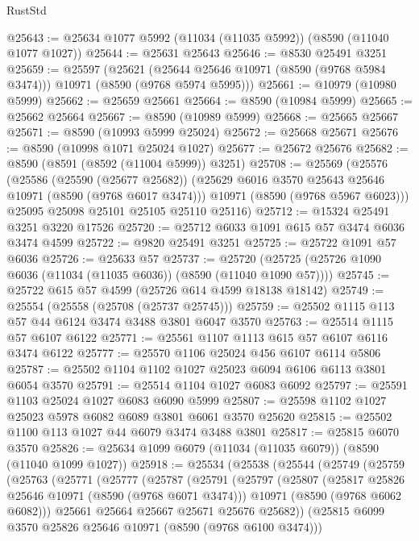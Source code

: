 \begin{lexlean}{RustStd}
\begin{coremodule}
@25643 := @25634 @1077 @5992 (@11034 (@11035 @5992)) (@8590 (@11040 @1077 @1027))
@25644 := @25631 @25643
@25646 := @8530 @25491 @3251
@25659 := @25597
    (@25621 (@25644 @25646 @10971 (@8590 (@9768 @5984 @3474))) @10971 (@8590 (@9768 @5974 @5995)))
@25661 := @10979 (@10980 @5999)
@25662 := @25659 @25661
@25664 := @8590 (@10984 @5999)
@25665 := @25662 @25664
@25667 := @8590 (@10989 @5999)
@25668 := @25665 @25667
@25671 := @8590 (@10993 @5999 @25024)
@25672 := @25668 @25671
@25676 := @8590 (@10998 @1071 @25024 @1027)
@25677 := @25672 @25676
@25682 := @8590 (@8591 (@8592 (@11004 @5999)) @3251)
@25708 := @25569
    (@25576
      (@25586
        (@25590 (@25677 @25682))
        (@25629 @6016 @3570 @25643 @25646 @10971 (@8590 (@9768 @6017 @3474)))
        @10971
        (@8590 (@9768 @5967 @6023)))
      @25095
      @25098
      @25101
      @25105
      @25110
      @25116)
@25712 := @15324 @25491 @3251 @3220 @17526
@25720 := @25712 @6033 @1091 @615 @57 @3474 @6036 @3474 @4599
@25722 := @9820 @25491 @3251
@25725 := @25722 @1091 @57 @6036
@25726 := @25633 @57
@25737 := @25720 (@25725 (@25726 @1090 @6036 (@11034 (@11035 @6036)) (@8590 (@11040 @1090 @57))))
@25745 := @25722 @615 @57 @4599 (@25726 @614 @4599 @18138 @18142)
@25749 := @25554 (@25558 (@25708 (@25737 @25745)))
@25759 := @25502 @1115 @113 @57 @44 @6124 @3474 @3488 @3801 @6047 @3570
@25763 := @25514 @1115 @57 @6107 @6122
@25771 := @25561 @1107 @1113 @615 @57 @6107 @6116 @3474 @6122
@25777 := @25570 @1106 @25024 @456 @6107 @6114 @5806
@25787 := @25502 @1104 @1102 @1027 @25023 @6094 @6106 @6113 @3801 @6054 @3570
@25791 := @25514 @1104 @1027 @6083 @6092
@25797 := @25591 @1103 @25024 @1027 @6083 @6090 @5999
@25807 := @25598 @1102 @1027 @25023 @5978 @6082 @6089 @3801 @6061 @3570 @25620
@25815 := @25502 @1100 @113 @1027 @44 @6079 @3474 @3488 @3801
@25817 := @25815 @6070 @3570
@25826 := @25634 @1099 @6079 (@11034 (@11035 @6079)) (@8590 (@11040 @1099 @1027))
@25918 := @25534
    (@25538
      (@25544
        (@25749
          (@25759
            (@25763
              (@25771
                (@25777
                  (@25787
                    (@25791
                      (@25797
                        (@25807
                          (@25817 @25826 @25646 @10971 (@8590 (@9768 @6071 @3474)))
                          @10971
                          (@8590 (@9768 @6062 @6082)))
                        @25661
                        @25664
                        @25667
                        @25671
                        @25676
                        @25682))
                    (@25815 @6099 @3570 @25826 @25646 @10971 (@8590 (@9768 @6100 @3474)))

\end{coremodule}
\end{lexlean}
